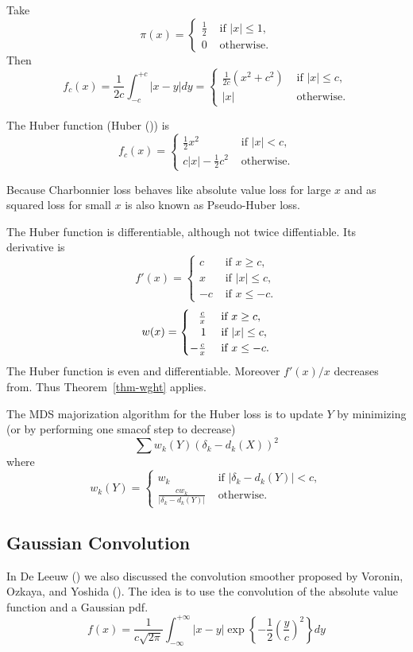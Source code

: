 \documentclass[
  12pt,
  letterpaper,
  DIV=11,
  numbers=noendperiod]{scrartcl}
\theoremstyle{plain}
\theoremstyle{remark}
\begin{document}
Take \[
\pi(x)=\begin{cases}\frac12 &\text{ if }|x|\leq 1,\\0&\text{ otherwise.}\end{cases}
\] Then \[
f_c(x)=\frac{1}{2c}\int_{-c}^{+c}|x-y|dy=\begin{cases}
\frac{1}{2c}(x^2+c^2)&\text{ if }|x|\leq c,\\
|x|&\text{ otherwise}.
\end{cases}
\]

The Huber function (Huber ()) is \[
f_c(x)=\begin{cases}
\frac12x^2&\text{ if }|x|<c,\\
c|x|-\frac12 c^2&\text{ otherwise}.
\end{cases}
\]

Because Charbonnier loss behaves like absolute value loss for large
\(x\) and as squared loss for small \(x\) is also known as Pseudo-Huber
loss.

The Huber function is differentiable, although not twice diffentiable.
Its derivative is \[
f'(x)=\begin{cases}
c&\text{ if }x\geq c,\\
x&\text{ if }|x|\leq c,\\
-c&\text{ if }x\leq -c.
\end{cases}
\] \[
w(x)=
\begin{cases}
\hfill\frac{c}{x}&\text{ if }x\geq c,\\\hfill1&\text{ if }|x|\leq c,\\
-\frac{c}{x}&\text{ if }x\leq -c.
\end{cases}
\] The Huber function is even and differentiable. Moreover \(f'(x)/x\)
decreases from. Thus Theorem~\ref{thm-wght} applies.

The MDS majorization algorithm for the Huber loss is to update \(Y\) by
minimizing (or by performing one smacof step to decrease) \[
\sum w_k(Y)(\delta_k-d_k(X))^2
\] where \[
w_k(Y)=\begin{cases}
w_k&\text{ if }|\delta_k-d_k(Y)|<c,\\
\frac{cw_k}{|\delta_k-d_k(Y)|}&\text{ otherwise}.
\end{cases}
\]

\subsection{Gaussian Convolution}\label{gaussian-convolution}

In De Leeuw () we also discussed the
convolution smoother proposed by Voronin, Ozkaya, and Yoshida
(). The idea is to use the
convolution of the absolute value function and a Gaussian pdf. \[
f(x)=\frac{1}{c\sqrt{2\pi}}\int_{-\infty}^{+\infty}|x-y|\exp\left\{-\frac12(\frac{y}{c})^2\right\}dy
\]
\end{document}
